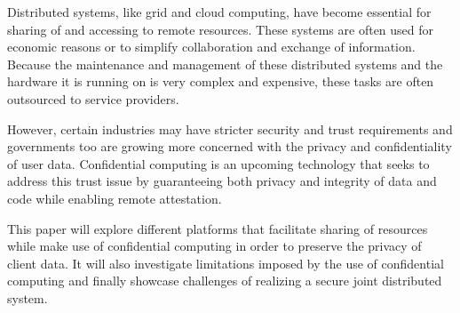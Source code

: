 
\Abstract

Distributed systems, like grid and cloud computing, have become essential for
sharing of and accessing to remote resources. These systems are often used for
economic reasons or to simplify collaboration and exchange of information.
Because the maintenance and management of these distributed systems and the
hardware it is running on is very complex and expensive, these tasks are often
outsourced to service providers.

However, certain industries may have stricter security and trust requirements
and governments too are growing more concerned with the privacy and
confidentiality of user data. Confidential computing is an upcoming
technology that seeks to address this trust issue by guaranteeing both privacy
and integrity of data and code while enabling remote attestation.

This paper will explore different platforms that facilitate sharing of resources
while make use of confidential computing in order to preserve the privacy of
client data. It will also investigate limitations imposed by the use of
confidential computing and finally showcase challenges of realizing a secure
joint distributed system.
